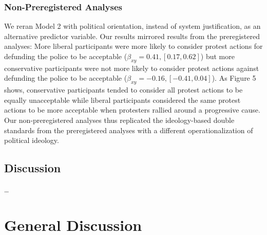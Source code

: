 \documentclass[twocolumn, 11pt, letterpaper]{article}
\begin{document}
\hypertarget{non-preregistered-analyses-1}{%
\subsubsection{Non-Preregistered
Analyses}\label{non-preregistered-analyses-1}}

We reran Model 2 with political orientation, instead of system
justification, as an alternative predictor variable. Our results
mirrored results from the preregistered analyses: More liberal
participants were more likely to consider protest actions for defunding
the police to be acceptable (\(\beta_{xy} = 0.41, [0.17, 0.62]\)) but
more conservative participants were not more likely to consider protest
actions against defunding the police to be acceptable
(\(\beta_{xy} = -0.16, [-0.41, 0.04]\)). As Figure 5 shows, conservative
participants tended to consider all protest actions to be equally
unacceptable while liberal participants considered the same protest
actions to be more acceptable when protesters rallied around a
progressive cause. Our non-preregistered analyses thus replicated the
ideology-based double standards from the preregistered analyses with a
different operationalization of political ideology.

\hypertarget{discussion-1}{%
\subsection{Discussion}\label{discussion-1}}

\ldots

\hypertarget{general-discussion}{%
\section{General Discussion}\label{general-discussion}}
\end{document}
